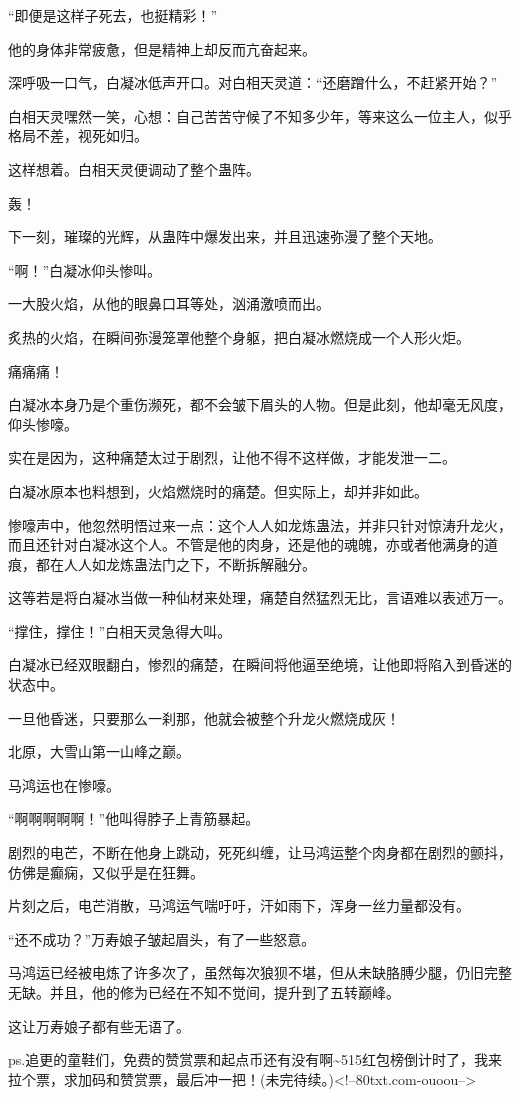 \begin{this_body}
“即便是这样子死去，也挺精彩！”

他的身体非常疲惫，但是精神上却反而亢奋起来。

深呼吸一口气，白凝冰低声开口。对白相天灵道：“还磨蹭什么，不赶紧开始？”

白相天灵嘿然一笑，心想：自己苦苦守候了不知多少年，等来这么一位主人，似乎格局不差，视死如归。

这样想着。白相天灵便调动了整个蛊阵。

轰！

下一刻，璀璨的光辉，从蛊阵中爆发出来，并且迅速弥漫了整个天地。

“啊！”白凝冰仰头惨叫。

一大股火焰，从他的眼鼻口耳等处，汹涌激喷而出。

炙热的火焰，在瞬间弥漫笼罩他整个身躯，把白凝冰燃烧成一个人形火炬。

痛痛痛！

白凝冰本身乃是个重伤濒死，都不会皱下眉头的人物。但是此刻，他却毫无风度，仰头惨嚎。

实在是因为，这种痛楚太过于剧烈，让他不得不这样做，才能发泄一二。

白凝冰原本也料想到，火焰燃烧时的痛楚。但实际上，却并非如此。

惨嚎声中，他忽然明悟过来一点：这个人人如龙炼蛊法，并非只针对惊涛升龙火，而且还针对白凝冰这个人。不管是他的肉身，还是他的魂魄，亦或者他满身的道痕，都在人人如龙炼蛊法门之下，不断拆解融分。

这等若是将白凝冰当做一种仙材来处理，痛楚自然猛烈无比，言语难以表述万一。

“撑住，撑住！”白相天灵急得大叫。

白凝冰已经双眼翻白，惨烈的痛楚，在瞬间将他逼至绝境，让他即将陷入到昏迷的状态中。

一旦他昏迷，只要那么一刹那，他就会被整个升龙火燃烧成灰！

北原，大雪山第一山峰之巅。

马鸿运也在惨嚎。

“啊啊啊啊啊！”他叫得脖子上青筋暴起。

剧烈的电芒，不断在他身上跳动，死死纠缠，让马鸿运整个肉身都在剧烈的颤抖，仿佛是癫痫，又似乎是在狂舞。

片刻之后，电芒消散，马鸿运气喘吁吁，汗如雨下，浑身一丝力量都没有。

“还不成功？”万寿娘子皱起眉头，有了一些怒意。

马鸿运已经被电炼了许多次了，虽然每次狼狈不堪，但从未缺胳膊少腿，仍旧完整无缺。并且，他的修为已经在不知不觉间，提升到了五转巅峰。

这让万寿娘子都有些无语了。

ps.追更的童鞋们，免费的赞赏票和起点币还有没有啊\~{}515红包榜倒计时了，我来拉个票，求加码和赞赏票，最后冲一把！(未完待续。)<!--80txt.com-ouoou-->

\end{this_body}

